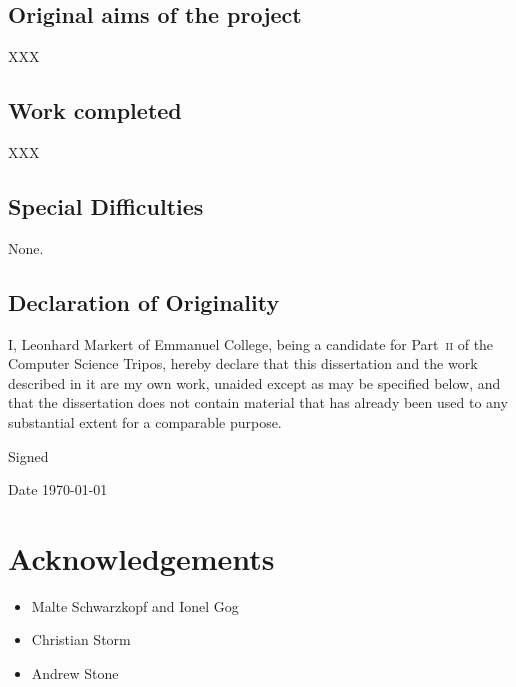 \documentclass[11pt,chapterprefix=true,toc=bibliography,numbers=noendperiod,
               footnotes=multiple,twoside]{scrreprt}
\begin{document}
\section*{Original aims of the project\label{sc:original-aims}}

XXX

\section*{Work completed\label{sc:work-completed}}

XXX

\section*{Special Difficulties\label{sc:special-difficulties}}

None.

\section*{Declaration of Originality\label{sc:declaration-of-originality}}

I, Leonhard Markert of Emmanuel College, being a candidate for Part~\textsc{ii} of the Computer Science Tripos, hereby declare that this dissertation and the work described in it are my own work, unaided except as may be specified below, and that the dissertation does not contain material that has already been used to any substantial extent for a comparable purpose.

\vspace{0.3in}
Signed

\vspace{0.2in}
Date \hspace{0.4in} \today

\chapter*{Acknowledgements\label{ch:acknowledgements}}

\begin{itemize}
    \item Malte Schwarzkopf and Ionel Gog
    \item Christian Storm
    \item Andrew Stone
\end{itemize}

\tableofcontents

\end{document}
